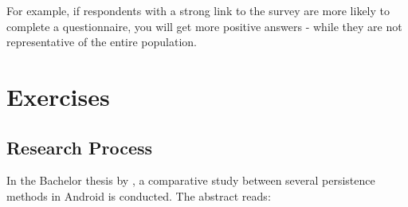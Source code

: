 For example, if respondents with a strong link to the survey are more likely to complete a questionnaire, you will get more positive answers - while they are not representative of the entire population.

\section{Exercises}
\label{sec:onderzoeksproces-oefeningen}

\subsection{Research Process}

In the Bachelor thesis by \textcite{Akin2016}, a comparative study between several persistence methods in Android is conducted. The abstract reads:

